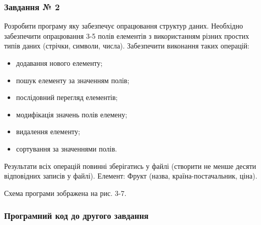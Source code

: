 \documentclass[12pt]{extreport}
\begin{document}
\subsubsection*{Завдання № 2}
Розробити програму яку забезпечує опрацювання структур даних.
Необхідно забезпечити опрацювання 3-5 полів елементів з використанням
різних простих типів даних (стрічки, символи, числа). Забезпечити виконання
таких операцій:
\begin{itemize}
\item додавання нового елементу;
\item пошук елементу за значенням полів;
\item послідовний перегляд елементів;
\item модифікація значень полів елемену;
\item видалення елементу;
\item сортування за значеннями полів.
\end{itemize}

Результати всіх операцій повинні зберігатись у файлі (створити не менше
десяти відповідних записів у файлі). Елемент: Фрукт (назва, країна-постачальник, ціна).

\bigskip
Схема програми зображена на рис. 3-7.

\subsubsection*{Програмний код до другого завдання}
\end{document}
